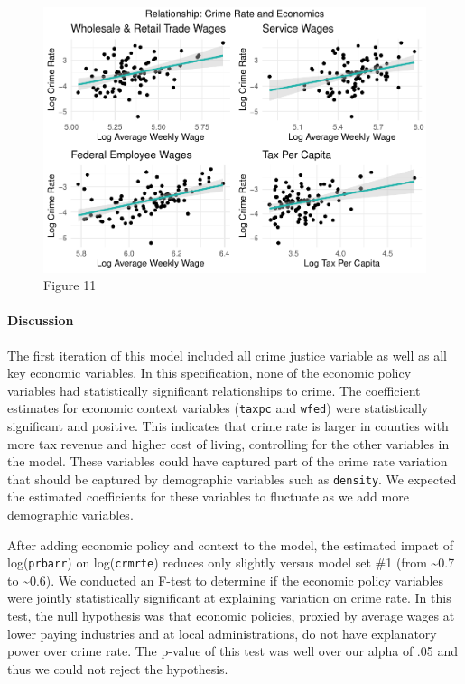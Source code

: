 \documentclass[]{article}
\let\oldparagraph\paragraph
\renewcommand{\paragraph}[1]{\oldparagraph{#1}\mbox{}}
\begin{document}
\begin{figure}

{\centering \includegraphics{lab_3_final_files/figure-latex/unnamed-chunk-34-1} 

}

\caption{Figure 11}\label{fig:unnamed-chunk-34}
\end{figure}

\hypertarget{discussion-1}{%
\paragraph{Discussion}\label{discussion-1}}

The first iteration of this model included all crime justice variable as
well as all key economic variables. In this specification, none of the
economic policy variables had statistically significant relationships to
crime. The coefficient estimates for economic context variables
(\texttt{taxpc} and \texttt{wfed}) were statistically significant and
positive. This indicates that crime rate is larger in counties with more
tax revenue and higher cost of living, controlling for the other
variables in the model. These variables could have captured part of the
crime rate variation that should be captured by demographic variables
such as \texttt{density}. We expected the estimated coefficients for
these variables to fluctuate as we add more demographic variables.

After adding economic policy and context to the model, the estimated
impact of log(\texttt{prbarr}) on log(\texttt{crmrte}) reduces only
slightly versus model set \#1 (from \textasciitilde{}0.7 to
\textasciitilde{}0.6). We conducted an F-test to determine if the
economic policy variables were jointly statistically significant at
explaining variation on crime rate. In this test, the null hypothesis
was that economic policies, proxied by average wages at lower paying
industries and at local administrations, do not have explanatory power
over crime rate. The p-value of this test was well over our alpha of .05
and thus we could not reject the hypothesis.
\end{document}
